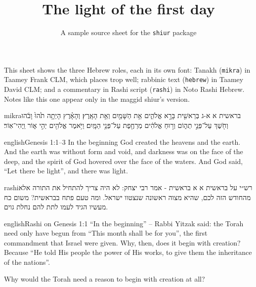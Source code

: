 \documentclass[11pt]{article}
\title{The light of the first day}
\author{A sample source sheet for the \texttt{shiur} package}
\date{}
\begin{document}
\maketitle

\begin{hearah}
This sheet shows the three Hebrew roles, each in its own font: Tanakh (\texttt{mikra}) in
Taamey Frank CLM, which places trop well; rabbinic text (\texttt{hebrew}) in Taamey David
CLM; and a commentary in Rashi script (\texttt{rashi}) in Noto Rashi Hebrew. Notes like this
one appear only in the maggid shiur's version.
\end{hearah}

\begin{mekor}
\begin{mekorlang}{mikra}{בראשית א א-ג}
בְּרֵאשִׁ֖ית בָּרָ֣א אֱלֹהִ֑ים אֵ֥ת הַשָּׁמַ֖יִם וְאֵ֥ת הָאָֽרֶץ׃
וְהָאָ֗רֶץ הָיְתָ֥ה תֹ֙הוּ֙ וָבֹ֔הוּ וְחֹ֖שֶׁךְ עַל־פְּנֵ֣י תְה֑וֹם וְר֣וּחַ אֱלֹהִ֔ים מְרַחֶ֖פֶת עַל־פְּנֵ֥י הַמָּֽיִם׃
וַיֹּ֥אמֶר אֱלֹהִ֖ים יְהִ֣י א֑וֹר וַֽיְהִי־אֽוֹר׃
\end{mekorlang}
\begin{mekorlang}{english}{Genesis 1:1--3}
In the beginning God created the heavens and the earth. And the earth was without form and
void, and darkness was on the face of the deep, and the spirit of God hovered over the face of
the waters. And God said, ``Let there be light'', and there was light.
\end{mekorlang}
\end{mekor}

\begin{mekor}
\begin{mekorlang}{rashi}{רש״י על בראשית א א}
בראשית - אמר רבי יצחק: לא היה צריך להתחיל את התורה אלא מהחודש הזה לכם, שהיא מצוה ראשונה שנצטוו ישראל. ומה טעם פתח בבראשית? משום כח מעשיו הגיד לעמו לתת להם נחלת גוים.
\end{mekorlang}
\begin{mekorlang}{english}{Rashi on Genesis 1:1}
``In the beginning'' -- Rabbi Yitz\hdot ak said: the Torah need only have begun from ``This
month shall be for you'', the first commandment that Israel were given. Why, then, does it
begin with creation? Because ``He told His people the power of His works, to give them the
inheritance of the nations''.
\end{mekorlang}
\end{mekor}

\begin{hearah}
Why would the Torah need a reason to begin with creation at all?
\end{hearah}
\end{document}
